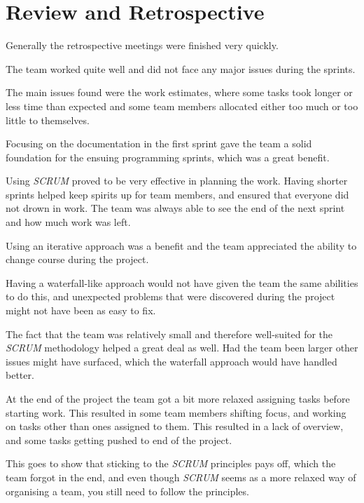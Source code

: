 \section{Review and Retrospective}

Generally the retrospective meetings were finished very quickly.

The team worked quite well and did not face any major issues during the sprints.

The main issues found were the work estimates, where some tasks took longer or less time than expected and some team members allocated either too much or too little to themselves.

Focusing on the documentation in the first sprint gave the team a solid foundation for the ensuing programming sprints, which was a great benefit.

Using \textit{SCRUM} proved to be very effective in planning the work. Having shorter sprints helped keep spirits up for team members, and ensured that everyone did not drown in work. The team was always able to see the end of the next sprint and how much work was left.

Using an iterative approach was a benefit and the team appreciated the ability to change course during the project.

Having a waterfall-like approach would not have given the team the same abilities to do this, and unexpected problems that were discovered during the project might not have been as easy to fix.

The fact that the team was relatively small and therefore well-suited for the \textit{SCRUM} methodology helped a great deal as well. Had the team been larger other issues might have surfaced, which the waterfall approach would have handled better.

At the end of the project the team got a bit more relaxed assigning tasks before starting work. This resulted in some team members shifting focus, and working on tasks other than ones assigned to them. This resulted in a lack of overview, and some tasks getting pushed to end of the project.

This goes to show that sticking to the \textit{SCRUM} principles pays off, which the team forgot in the end, and even though \textit{SCRUM} seems as a more relaxed way of organising a team, you still need to follow the principles.\\


